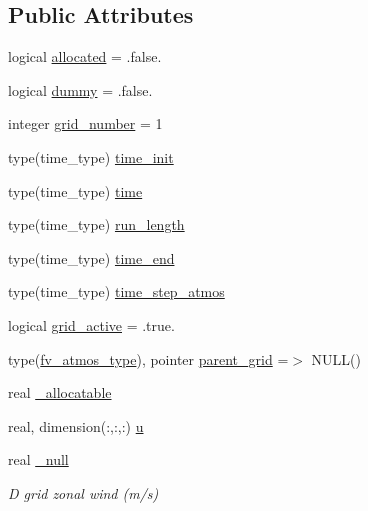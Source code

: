 \subsection*{Public Attributes}
\begin{DoxyCompactItemize}
\item 
logical \hyperlink{structfv__arrays__mod_1_1fv__atmos__type_aad4bddd3e4ffbb1cf0b37c3057709fdc}{allocated} = .false.
\item 
logical \hyperlink{structfv__arrays__mod_1_1fv__atmos__type_a124c10f670d516b0517bdc038b66c857}{dummy} = .false.
\item 
integer \hyperlink{structfv__arrays__mod_1_1fv__atmos__type_a186d371efd7b4ab4dc508fde35315dcf}{grid\-\_\-number} = 1
\item 
type(time\-\_\-type) \hyperlink{structfv__arrays__mod_1_1fv__atmos__type_a2250fa17165a7e44f75420a519cc72cf}{time\-\_\-init}
\item 
type(time\-\_\-type) \hyperlink{structfv__arrays__mod_1_1fv__atmos__type_ae610371fcfe85e6d7dc1fa87fdce7727}{time}
\item 
type(time\-\_\-type) \hyperlink{structfv__arrays__mod_1_1fv__atmos__type_ad7f9725ebc9ed275affe742ae6384720}{run\-\_\-length}
\item 
type(time\-\_\-type) \hyperlink{structfv__arrays__mod_1_1fv__atmos__type_ae49eef6008ea3ff710d90c56eacfe6a6}{time\-\_\-end}
\item 
type(time\-\_\-type) \hyperlink{structfv__arrays__mod_1_1fv__atmos__type_aaff3c348215efb0095c2e8c196efe1a7}{time\-\_\-step\-\_\-atmos}
\item 
logical \hyperlink{structfv__arrays__mod_1_1fv__atmos__type_aa4c6e33a14ec7220f5852ee87cd2e71c}{grid\-\_\-active} = .true.
\item 
type(\hyperlink{structfv__arrays__mod_1_1fv__atmos__type}{fv\-\_\-atmos\-\_\-type}), pointer \hyperlink{structfv__arrays__mod_1_1fv__atmos__type_a024a613cbb8da76610bec384b7a37bfb}{parent\-\_\-grid} =$>$ N\-U\-L\-L()
\item 
real \hyperlink{structfv__arrays__mod_1_1fv__atmos__type_a95b1ec35498953d190b394d9390b6a02}{\-\_\-allocatable}
\item 
real, dimension(\-:,\-:,\-:) \hyperlink{structfv__arrays__mod_1_1fv__atmos__type_a5ff3358578eee5de976eb794574fe5c3}{u}
\item 
real \hyperlink{structfv__arrays__mod_1_1fv__atmos__type_a6c2bbca5c19e33f65a51df86735d512a}{\-\_\-null}
\begin{DoxyCompactList}\small\item\em D grid zonal wind (m/s) \end{DoxyCompactList}\item 

\end{DoxyCompactItemize}
